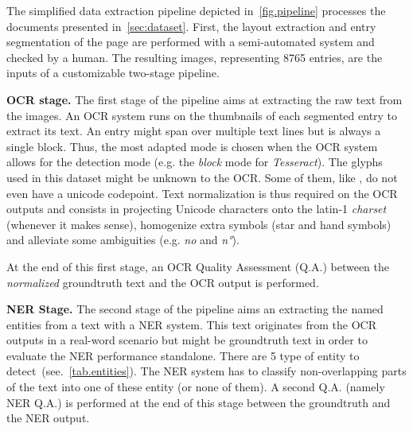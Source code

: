 
The simplified data extraction pipeline depicted in~\cref{fig.pipeline} processes the documents presented
in~\cref{sec:dataset}. First, the layout extraction and entry segmentation of the page are performed with a
semi-automated system and checked by a human. The resulting images, representing 8765 entries, are the inputs of a customizable two-stage pipeline.

\textbf{OCR stage.} The first stage of the pipeline aims at extracting the raw text from the images. An OCR system runs
on the thumbnails of each segmented entry to extract its text. An entry might span over multiple text lines but is
always a single block. Thus, the most adapted mode is chosen when the OCR system allows for the detection mode (e.g. the
\emph{block} mode for \emph{Tesseract}). The glyphs used in this dataset might be unknown to the OCR. Some of them, like
, do not even have a unicode codepoint. Text normalization is thus required
on the OCR outputs and consists in projecting Unicode characters onto the latin-1 \emph{charset} (whenever it makes
sense), homogenize extra symbols (star and hand symbols) and alleviate some ambiguities (e.g. \emph{no} and \emph{n°}).

At the end of this first stage, an OCR Quality Assessment (Q.A.) between the \emph{normalized} groundtruth text and the
OCR output is performed.





\textbf{NER Stage.} The second stage of the pipeline aims an extracting the named entities from a text with a NER
system. This text originates from the OCR outputs in a real-word scenario but might be groundtruth text in order to
evaluate the NER performance standalone. There are 5 type of entity to detect~(see.~\cref{tab.entities}).
The NER system has to classify non-overlapping parts of the text into one of these entity (or none of them). A second
Q.A. (namely NER Q.A.) is performed at the end of this stage between the groundtruth and the NER output.

